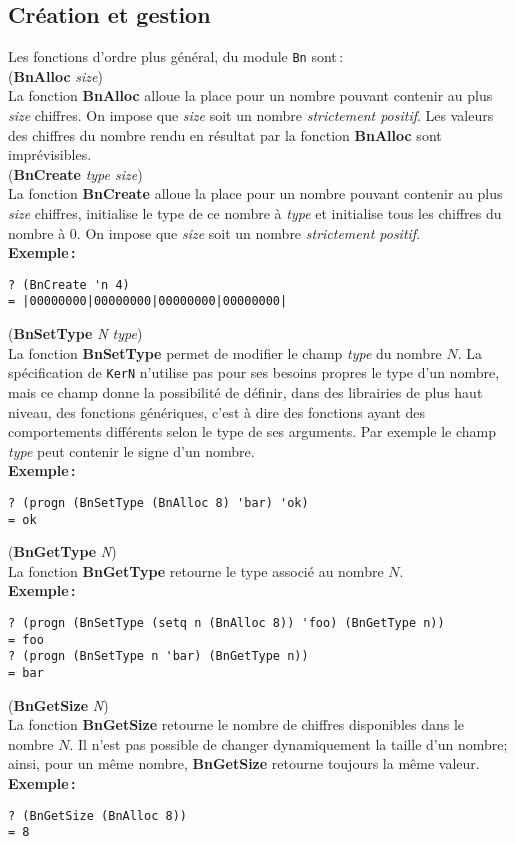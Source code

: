 \subsection{Cr\'eation et gestion}
Les fonctions d'ordre plus g\'en\'eral, du module \verb+Bn+ sont\,:
\\[24pt]
({\bf BnAlloc} {\em size})
\\[12pt]
La fonction {\bf BnAlloc} alloue la place pour un nombre pouvant contenir
au plus {\em size} chiffres. On impose que {\em size} soit un nombre
{\em strictement positif}.
Les valeurs des chiffres du nombre rendu en r\'esultat par la fonction
{\bf BnAlloc} sont impr\'evisibles.
\\[24pt]
({\bf BnCreate} {\em type size})
\\[12pt]
La fonction {\bf BnCreate} alloue la place pour un nombre pouvant contenir
au plus {\em size} chiffres, initialise le type de ce nombre \`a
{\em type} et initialise tous les chiffres du nombre \`a 0. On impose que
{\em size} soit un nombre {\em strictement positif}.
\\[18pt]
{\bf Exemple\,:}
\begin{verbatim}
? (BnCreate 'n 4)
= |00000000|00000000|00000000|00000000|
\end{verbatim}
\vspace*{24pt}
({\bf BnSetType} {\em N type})
\\[12pt]
La fonction {\bf BnSetType} permet de modifier le champ {\em type} du nombre
$N$. La sp\'ecification de \verb+KerN+ n'utilise pas pour ses besoins
propres le type d'un nombre, mais ce champ donne la possibilit\'e de
d\'efinir, dans des librairies de plus haut niveau, des fonctions
g\'en\'eriques, c'est \`a dire des fonctions ayant des comportements
diff\'erents selon le type de ses arguments. Par exemple le champ {\em type}
peut contenir le signe d'un nombre.
\\[18pt]
{\bf Exemple\,:}
\begin{verbatim}
? (progn (BnSetType (BnAlloc 8) 'bar) 'ok)
= ok
\end{verbatim}
\vspace*{24pt}
({\bf BnGetType} {\em N})
\\[12pt]
La fonction {\bf BnGetType} retourne le type associ\'e au nombre $N$.
\\[18pt]
{\bf Exemple\,:}
\begin{verbatim}
? (progn (BnSetType (setq n (BnAlloc 8)) 'foo) (BnGetType n))
= foo
? (progn (BnSetType n 'bar) (BnGetType n))
= bar
\end{verbatim}
\vspace*{24pt}
({\bf BnGetSize} {\em N})
\\[12pt]
La fonction {\bf BnGetSize} retourne le nombre de chiffres disponibles dans
le nombre $N$. Il n'est pas possible de changer dynamiquement la
taille d'un nombre; ainsi, pour un m\^eme nombre, {\bf BnGetSize} retourne
toujours la m\^eme valeur.
\\[18pt]
{\bf Exemple\,:}
\begin{verbatim}
? (BnGetSize (BnAlloc 8))
= 8
\end{verbatim}
\vspace*{24pt}

